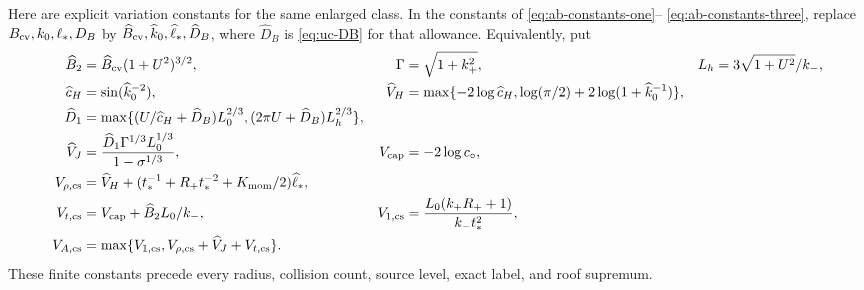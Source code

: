 Here are explicit variation constants for the same enlarged class.
In the constants of \eqref{eq:ab-constants-one}--
\eqref{eq:ab-constants-three}, replace
$B_{\rm cv},k_0,\ell_*,D_B$ by
$\widehat B_{\rm cv},\widehat k_0,\widehat\ell_*,\widehat D_B$,
where $\widehat D_B$ is \eqref{eq:uc-DB} for that allowance.
Equivalently, put
\begin{align}
 \widehat B_2&=\widehat B_{\rm cv}(1+U^2)^{3/2},&
 \Gamma&=\sqrt{1+k_+^2},&
 L_h&=3\sqrt{1+U^2}/k_-,\notag\\
 \widehat c_H&=\sin(\widehat k_0^{-2}),&
 \widehat V_H&=\max\{-2\log\widehat c_H,
        \log(\pi/2)+2\log(1+\widehat k_0^{-1})\},\notag\\
 \widehat D_1&=\max\{(U/\widehat c_H+\widehat D_B)L_0^{2/3},
                   (2\pi U+\widehat D_B)L_h^{2/3}\},\notag\\
 \widehat V_J&=\frac{\widehat D_1\Gamma^{1/3}L_0^{1/3}}
                         {1-\sigma^{1/3}},&
 V_{\rm cap}&=-2\log c_\circ,\notag\\
 V_{\rho,\rm cs}&=\widehat V_H+
       (t_*^{-1}+R_+t_*^{-2}+K_{\rm mom}/2)\widehat\ell_*,\notag\\
 V_{t,\rm cs}&=V_{\rm cap}+\widehat B_2L_0/k_-,&
 V_{1,\rm cs}&=\frac{L_0(k_+R_++1)}{k_-t_*^2},\notag\\
 V_{A,\rm cs}&=\max\{V_{1,\rm cs},
                  V_{\rho,\rm cs}+\widehat V_J+V_{t,\rm cs}\}.
                                                        \label{eq:cs-variation-constants}
\end{align}
These finite constants precede every radius, collision count,
source level, exact label, and roof supremum.

